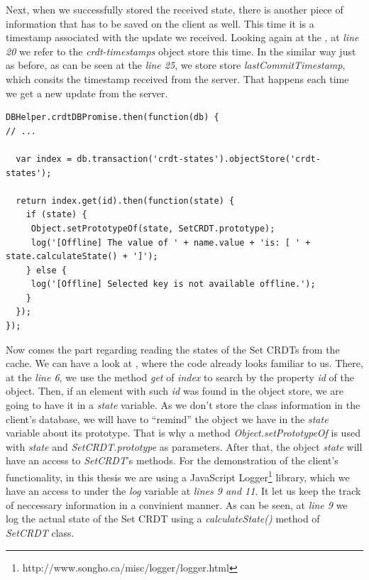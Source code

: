 Next, when we successfully stored the received state, there is another piece of information that has to be saved on the client as well. This time it is a timestamp associated with the update we received. Looking again at the , at \textit{line 20} we refer to the \textit{crdt-timestamps} object store this time. In the similar way just as before, as can be seen at the \textit{line 25}, we store store \textit{lastCommitTimestamp}, which consits the timestamp received from the server. That happens each time we get a new update from the server.


\begin{lstlisting}[caption={Reading CRDT states from client's cache.}, label={lst:dev10}]
DBHelper.crdtDBPromise.then(function(db) {
// ...

  var index = db.transaction('crdt-states').objectStore('crdt-states');

  return index.get(id).then(function(state) {
    if (state) {
     Object.setPrototypeOf(state, SetCRDT.prototype);
     log('[Offline] The value of ' + name.value + 'is: [ ' + state.calculateState() + ']');
    } else {
     log('[Offline] Selected key is not available offline.');
    }
  });
});
\end{lstlisting}

Now comes the part regarding reading the states of the Set CRDTs from the cache. We can have a look at , where the code already looks familiar to us. There, at the \textit{line 6}, we use the method \textit{get} of \textit{index} to search by the property \textit{id} of the object. Then, if an element with such \textit{id} was found in the object store, we are going to have it in a \textit{state} variable. As we don't store the class information in the client's database, we will have to ``remind'' the object we have in the \textit{state} variable about its prototype. That is why a method \textit{Object.setPrototypeOf} is used with \textit{state} and \textit{SetCRDT.prototype} as parameters. After that, the object \textit{state} will have an access to \textit{SetCRDT}'s methods. For the demonstration of the client's functionality, in this thesis we are using a JavaScript Logger\footnote{http://www.songho.ca/misc/logger/logger.html} library, which we have an access to under the \textit{log} variable at \textit{lines 9 and 11}. It let us keep the track of neccessary information in a convinient manner. As can be seen, at \textit{line 9} we log the actual state of the Set CRDT using a \textit{calculateState()} method of \textit{SetCRDT} class.

